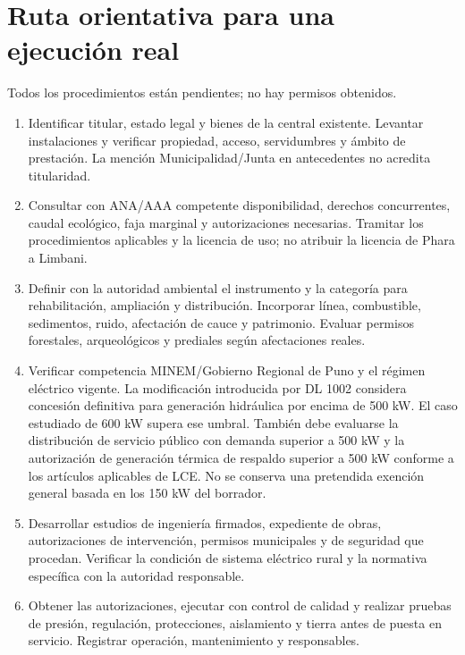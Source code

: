 \section{Ruta orientativa para una ejecución real}
Todos los procedimientos están pendientes; no hay permisos obtenidos.
\begin{enumerate}
\item Identificar titular, estado legal y bienes de la central existente. Levantar instalaciones y verificar propiedad, acceso, servidumbres y ámbito de prestación. La mención Municipalidad/Junta en antecedentes no acredita titularidad.
\item Consultar con ANA/AAA competente disponibilidad, derechos concurrentes, caudal ecológico, faja marginal y autorizaciones necesarias. Tramitar los procedimientos aplicables y la licencia de uso; no atribuir la licencia de Phara a Limbani.
\item Definir con la autoridad ambiental el instrumento y la categoría para rehabilitación, ampliación y distribución. Incorporar línea, combustible, sedimentos, ruido, afectación de cauce y patrimonio. Evaluar permisos forestales, arqueológicos y prediales según afectaciones reales.
\item Verificar competencia MINEM/Gobierno Regional de Puno y el régimen eléctrico vigente. La modificación introducida por DL 1002 considera concesión definitiva para generación hidráulica por encima de 500 kW. El caso estudiado de 600 kW supera ese umbral. También debe evaluarse la distribución de servicio público con demanda superior a 500 kW y la autorización de generación térmica de respaldo superior a 500 kW conforme a los artículos aplicables de LCE. No se conserva una pretendida exención general basada en los 150 kW del borrador.
\item Desarrollar estudios de ingeniería firmados, expediente de obras, autorizaciones de intervención, permisos municipales y de seguridad que procedan. Verificar la condición de sistema eléctrico rural y la normativa específica con la autoridad responsable.
\item Obtener las autorizaciones, ejecutar con control de calidad y realizar pruebas de presión, regulación, protecciones, aislamiento y tierra antes de puesta en servicio. Registrar operación, mantenimiento y responsables.
\end{enumerate}
